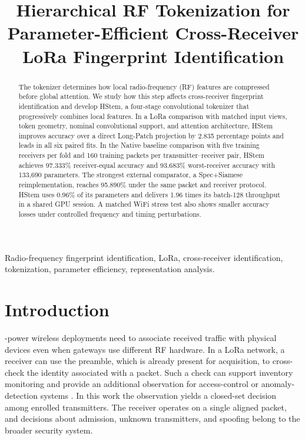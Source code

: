 \documentclass[journal]{IEEEtran}
\begin{document}
\title{Hierarchical RF Tokenization for Parameter-Efficient Cross-Receiver LoRa Fingerprint Identification}
\maketitle
\begin{abstract}
The tokenizer determines how local radio-frequency (RF) features are compressed before global attention. We study how this step affects cross-receiver fingerprint identification and develop HStem, a four-stage convolutional tokenizer that progressively combines local features. In a LoRa comparison with matched input views, token geometry, nominal convolutional support, and attention architecture, HStem improves accuracy over a direct Long-Patch projection by 2.835 percentage points and leads in all six paired fits. In the Native baseline comparison with five training receivers per fold and 160 training packets per transmitter--receiver pair, HStem achieves 97.333\% receiver-equal accuracy and 93.683\% worst-receiver accuracy with 133,690 parameters. The strongest external comparator, a Spec+Siamese reimplementation, reaches 95.890\% under the same packet and receiver protocol. HStem uses 0.96\% of its parameters and delivers 1.96 times its batch-128 throughput in a shared GPU session. A matched WiFi stress test also shows smaller accuracy losses under controlled frequency and timing perturbations.
\end{abstract}
\begin{IEEEkeywords}
Radio-frequency fingerprint identification, LoRa, cross-receiver identification, tokenization, parameter efficiency, representation analysis.
\end{IEEEkeywords}


\section{Introduction}
-power wireless deployments need to associate received traffic with physical devices even when gateways use different RF hardware. In a LoRa network, a receiver can use the preamble, which is already present for acquisition, to cross-check the identity associated with a packet. Such a check can support inventory monitoring and provide an additional observation for access-control or anomaly-detection systems \cite{zhang2025survey}. In this work the observation yields a closed-set decision among enrolled transmitters. The receiver operates on a single aligned packet, and decisions about admission, unknown transmitters, and spoofing belong to the broader security system.
\end{document}
